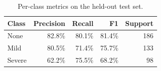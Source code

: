 \begin{table}[!t]
\centering
\caption{Per-class metrics on the held-out test set.}
\label{tab:classes}
\begin{tabular}{lrrrr}
\toprule
Class & Precision & Recall & F1 & Support \\
\midrule
None & 82.8\% & 80.1\% & 81.4\% & 186 \\
Mild & 80.5\% & 71.4\% & 75.7\% & 133 \\
Severe & 62.2\% & 75.5\% & 68.2\% & 98 \\
\bottomrule
\end{tabular}
\end{table}
